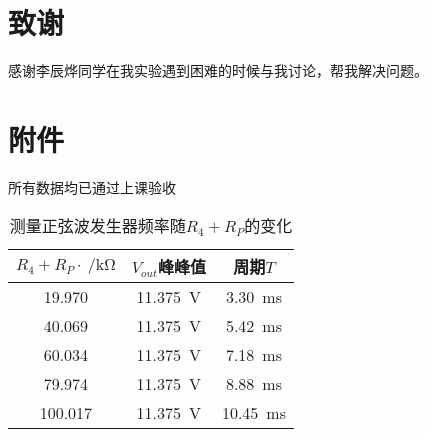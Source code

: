 \documentclass[UTF8]{ctexart}
\numberwithin{figure}{subsection}
\numberwithin{table}{subsection}
\numberwithin{equation}{subsection}
\begin{document}
\section*{致谢}
\par 感谢李辰烨同学在我实验遇到困难的时候与我讨论，帮我解决问题。
\section*{附件}
\par 所有数据均已通过上课验收

\begin{table}[h]
    \begin{center}
        \caption{测量正弦波发生器频率随\(R_4+R_P\)的变化}
        \begin{tabular}{|c|c|c|}
            \hline
            \(R_4+R_P\cdot \SI{}{\per\kilo\ohm}\) & \(V_{out}\)峰峰值 & 周期\(T\) \\
            \hline
            19.970 & \SI{11.375}{\volt} & \SI{3.30}{\milli\second} \\
            \hline
            40.069 & \SI{11.375}{\volt} & \SI{5.42}{\milli\second} \\
            \hline
            60.034 & \SI{11.375}{\volt} & \SI{7.18}{\milli\second} \\
            \hline
            79.974 & \SI{11.375}{\volt} & \SI{8.88}{\milli\second} \\
            \hline
            100.017 & \SI{11.375}{\volt} & \SI{10.45}{\milli\second} \\
            \hline
        \end{tabular}
    \end{center}
\end{table}
\end{document}
